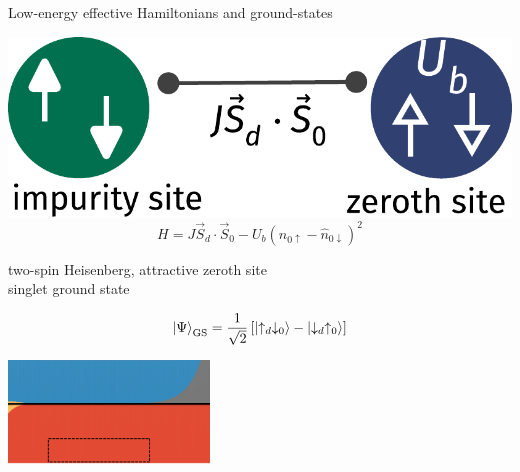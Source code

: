 \documentclass[9pt,aspectratio=169]{beamer}
\begin{document}
\begin{frame}{Low-energy effective Hamiltonians and ground-states}
{{\begin{minipage}{0.4\textwidth}
\includegraphics[width=\textwidth]{singlet.pdf}
\[H = J \vec{S}_d\cdot\vec{S}_0 - U_b\left( \hat n_{0 \uparrow} - \hat n_{0 \downarrow} \right)^2\]
\end{minipage}
\hspace*{\fill}
\begin{minipage}{0.45\textwidth}
\vspace*{\fill}
\begin{enumerate}
\nitem two-spin Heisenberg, attractive zeroth site \\[6pt]
\nitem \alert{singlet} ground state\\[10pt]
\end{enumerate}
\[\ket{\Psi}_\text{GS} = \frac{1}{\sqrt 2}\left[\ket{\uparrow_d \downarrow_0} - \ket{\downarrow_d \uparrow_0}\right] \]
\end{minipage}
}

\vspace*{\fill}

\includegraphics[width=0.4\textwidth]{phase-map-MIT1.pdf}
}

\end{frame}
\end{document}
